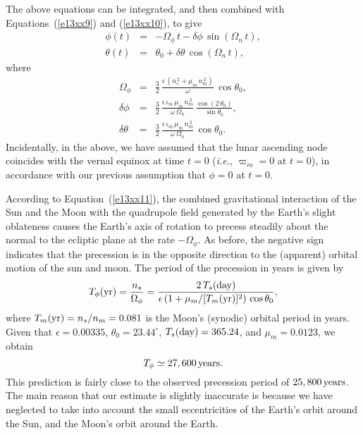 The above equations can be integrated,  and then combined with
Equations~(\ref{e13xx9}) and (\ref{e13xx10}), to give
\begin{eqnarray}\label{e13xx11}
\phi(t) &=& - \Omega_\phi\,t - \delta\phi\,\sin(\Omega_n\,t),\\[0.5ex]
\theta(t) &=& \theta_0 + \delta\theta\,\cos(\Omega_n\,t),\label{e13xx12}
\end{eqnarray}
where
\begin{eqnarray}
\Omega_\phi &=& \frac{3}{2}\,\frac{\epsilon\,(n_s^{\,2}+\mu_m\,n_m^{\,2})}{\omega}\,\cos\theta_0,\\[0.5ex]
\delta\phi &=& \frac{3}{2}\,\frac{\epsilon\,\iota_m\,\mu_m\,n_m^{\,2}}{\omega\,\Omega_n}\,\frac{\cos(2\,\theta_0)}{\sin\theta_0},\\[0.5ex]
\delta\theta &=& \frac{3}{2}\,\frac{\epsilon\,\iota_m\,\mu_m\,n_m^{\,2}}{\omega\,\Omega_n}\,\cos\theta_0.
\end{eqnarray}
Incidentally, in the above,  we have assumed that the lunar ascending node coincides with the vernal
equinox at time $t=0$ ({\em i.e.}, $\varpi_m=0$ at $t=0$), in accordance with our previous assumption that $\phi=0$ at $t=0$. 

According to Equation~(\ref{e13xx11}), the combined gravitational interaction of the Sun and the Moon with the
quadrupole field generated by the Earth's slight oblateness causes the Earth's axis of rotation to
precess steadily about the normal to the ecliptic plane at the rate $-\Omega_\phi$. 
As before, the negative sign indicates that the precession is in the opposite direction to the (apparent) orbital
motion of the sun and moon. The period of the precession in years is given by
\begin{equation}
T_\phi({\rm yr}) = \frac{n_s}{\Omega_\phi} = \frac{2\,T_s({\rm day})}{\epsilon\,(1+\mu_m/[T_m({\rm yr})]^2)\,\cos\theta_0},
\end{equation}
where $T_m({\rm yr})= n_s/n_m=0.081$ is the Moon's (synodic) orbital period in years. Given
that $\epsilon=0.00335$, $\theta_0=23.44^\circ$, $T_s({\rm day})=365.24$, and $\mu_m=0.0123$, we
obtain
\begin{equation}
T_\phi\simeq 27,600\,{\rm years}.
\end{equation}
This prediction is fairly close to the observed precession period of $25,800\,{\rm years}$. The main reason that our estimate is slightly inaccurate is because we have  neglected to take into
account the small eccentricities of the Earth's orbit around the Sun, and the Moon's orbit around
the Earth. 

